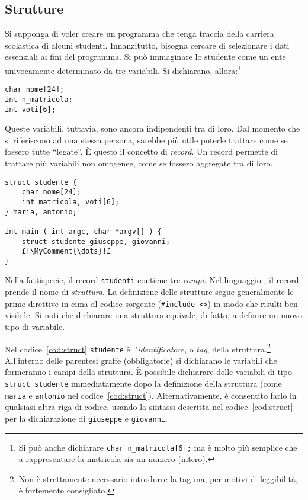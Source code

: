 		\subsection{Strutture}
		\label{subsec:record}
Si supponga di voler creare un programma che tenga traccia della carriera scolastica di alcuni studenti.
Innanzitutto, bisogna cercare di selezionare i dati essenziali ai fini del programma.
Si può immaginare lo studente come un ente univocamente determinato da tre variabili.
Si dichiarano, allora:\footnote{Si può anche dichiarare \lstinline!char n_matricola[6];! ma è molto più semplice che a rappresentare la matricola sia un numero (intero).}
\begin{lstlisting}
char nome[24];
int n_matricola;
int voti[6];
\end{lstlisting}
Queste variabili, tuttavia, sono ancora indipendenti tra di loro.
Dal momento che si riferiscono ad una stessa persona, sarebbe più utile poterle trattare come se fossero tutte ``legate''.
È questo il concetto di \emph{record}.
Un record permette di trattare più variabili non omogenee, come se fossero aggregate tra di loro.
\begin{lstlisting}[caption={[\em Struttura e variabili] {\em Definizione di una struttura e dichiarazione di variabili.}}, label={cod:struct}]
struct studente {
	char nome[24];
	int matricola, voti[6];
} maria, antonio;

int main ( int argc, char *argv[] ) {
	struct studente giuseppe, giovanni;
	£!\MyComment{\dots}!£
}
\end{lstlisting}
Nella fattispecie, il record \lstinline!studenti! contiene tre \emph{campi}.
Nel linguaggio , il record prende il nome di \emph{struttura}.
La definizione delle strutture segue generalmente le prime direttive in cima al codice sorgente (\lstinline!#include <!\lstinline!>!) in modo che risulti ben visibile.
Si noti che dichiarare una struttura equivale, di fatto, a definire un nuovo tipo di variabile.

Nel codice~\vref{cod:struct} \lstinline!studente! è l'\emph{identificatore}, o \emph{tag}, della struttura.\footnote{Non è strettamente necessario introdurre la tag ma, per motivi di leggibilità, è fortemente consigliato.}
All'interno delle parentesi graffe (obbligatorie) si dichiarano le variabili che formeranno i campi della struttura.
\`E possibile dichiarare delle variabili di tipo \lstinline!struct studente! immediatamente dopo la definizione della struttura (come \lstinline!maria! e \lstinline!antonio! nel codice~\ref{cod:struct}).
Alternativamente, è consentito farlo in qualsiasi altra riga di codice, usando la sintassi descritta nel codice~\ref{cod:struct} per la dichiarazione di \lstinline!giuseppe! e \lstinline!giovanni!.


